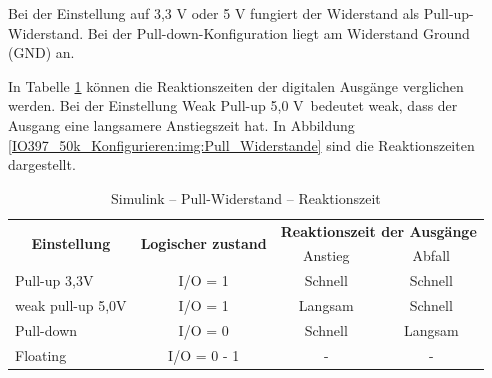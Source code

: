 Bei der Einstellung auf 3,3 V oder 5 V fungiert der Widerstand als Pull-up-Widerstand. Bei der Pull-down-Konfiguration liegt am Widerstand Ground (GND) an.



In Tabelle \ref{IO397_50k_Konfigurieren:tab:Reaktionszeit} können die Reaktionszeiten der digitalen Ausgänge verglichen werden. Bei der Einstellung \frqq Weak Pull-up 5,0 V\flqq\ bedeutet \frqq weak\flqq, dass der Ausgang eine langsamere Anstiegszeit hat. In Abbildung \ref{IO397_50k_Konfigurieren:img:Pull_Widerstande} sind die Reaktionszeiten dargestellt.


\pagebreak[1]
\begin{table}[!ht]
	\centering
	\caption{Simulink – Pull-Widerstand – Reaktionszeit}
	\label{IO397_50k_Konfigurieren:tab:Reaktionszeit}
	\begin{tabular}{lccc}
		\hline
		\multicolumn{1}{c}{\multirow{2}{*}{\textbf{Einstellung}}} & \multicolumn{1}{c}{\multirow{2}{*}{\textbf{Logischer zustand}}} & \multicolumn{2}{c}{\textbf{Reaktionszeit der Ausgänge}}           \\ \cline{3-4}
		\multicolumn{1}{c}{}                                      & \multicolumn{1}{c}{}                                            & Anstieg                                                 & Abfall  \\ \hline
		\multicolumn{1}{l|}{Pull-up 3,3V}                         & I/O = 1                                                         & Schnell                                                 & Schnell \\
		\multicolumn{1}{l|}{weak pull-up 5,0V}                    & I/O = 1                                                         & Langsam                                                 & Schnell \\
		\multicolumn{1}{l|}{Pull-down}                            & I/O = 0                                                         & Schnell                                                 & Langsam \\
		\multicolumn{1}{l|}{Floating}                             & I/O = 0 - 1                                                     & -                                                       & -       \\ \hline
	\end{tabular}
\end{table}
\pagebreak[1]



